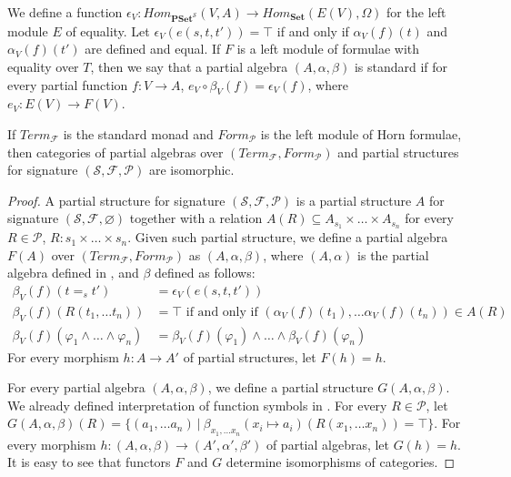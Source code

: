 \documentclass{elsarticle}
\theoremstyle{definition}
\theoremstyle{remark}
\newcommand{\cat}[1]{\mathbf{#1}}
\newcommand{\Set}{\cat{Set}}
\newcommand{\PSet}{\cat{PSet}}
\numberwithin{figure}{section}
\begin{document}
We define a function $\epsilon_V : Hom_{\PSet^\mathcal{S}}(V,A) \to Hom_\Set(E(V),\Omega)$ for the left module $E$ of equality.
Let $\epsilon_V(e(s,t,t')) = \top$ if and only if $\alpha_V(f)(t)$ and $\alpha_V(f)(t')$ are defined and equal.
If $F$ is a left module of formulae with equality over $T$, then we say that a partial algebra $(A,\alpha,\beta)$ is standard
    if for every partial function $f : V \to A$, $e_V \circ \beta_V(f) = \epsilon_V(f)$, where $e_V : E(V) \to F(V)$.

\begin{lem}
If $Term_\mathcal{F}$ is the standard monad and $Form_\mathcal{P}$ is the left module of Horn formulae,
    then categories of partial algebras over $(Term_\mathcal{F},Form_\mathcal{P})$ and partial structures for signature $(\mathcal{S},\mathcal{F},\mathcal{P})$ are isomorphic.
\end{lem}
\begin{proof}
A partial structure for signature $(\mathcal{S},\mathcal{F},\mathcal{P})$ is a partial structure $A$ for signature $(\mathcal{S},\mathcal{F},\varnothing)$
    together with a relation $A(R) \subseteq A_{s_1} \times \ldots \times A_{s_n}$ for every $R \in \mathcal{P}$, $R : s_1 \times \ldots \times s_n$.
Given such partial structure, we define a partial algebra $F(A)$ over $(Term_\mathcal{F},Form_\mathcal{P})$ as $(A,\alpha,\beta)$,
    where $(A,\alpha)$ is the partial algebra defined in , and $\beta$ defined as follows:
\begin{align*}
\beta_V(f)(t =_s t') & = \epsilon_V(e(s,t,t')) \\
\beta_V(f)(R(t_1, \ldots t_n)) & = \top \text{ if and only if } (\alpha_V(f)(t_1), \ldots \alpha_V(f)(t_n)) \in A(R) \\
\beta_V(f)(\varphi_1 \land \ldots \land \varphi_n) & = \beta_V(f)(\varphi_1) \land \ldots \land \beta_V(f)(\varphi_n)
\end{align*}
For every morphism $h : A \to A'$ of partial structures, let $F(h) = h$.

For every partial algebra $(A,\alpha,\beta)$, we define a partial structure $G(A,\alpha,\beta)$.
We already defined interpretation of function symbols in .
For every $R \in \mathcal{P}$, let $G(A,\alpha,\beta)(R) = \{ (a_1, \ldots a_n)\ |\ \beta_{x_1, \ldots x_n}(x_i \mapsto a_i)(R(x_1, \ldots x_n)) = \top \}$.
For every morphism $h : (A,\alpha,\beta) \to (A',\alpha',\beta')$ of partial algebras, let $G(h) = h$.
It is easy to see that functors $F$ and $G$ determine isomorphisms of categories.
\end{proof}
\end{document}

